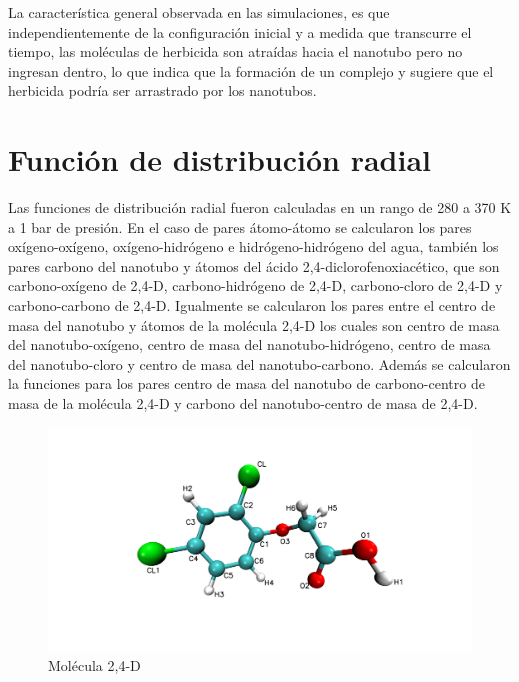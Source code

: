 La característica general observada en las simulaciones, es que independientemente de la configuración inicial y a medida que transcurre el tiempo, las moléculas de herbicida son atraídas hacia el nanotubo pero no ingresan dentro, lo que indica que la formación de un complejo y sugiere que el herbicida podría ser arrastrado por los nanotubos.

\section{Función de distribución radial}

Las funciones de distribución radial fueron calculadas en un rango de 280 a 370 K a 1 bar de presión. En el caso de pares átomo-átomo se calcularon los pares oxígeno-oxígeno, oxígeno-hidrógeno e hidrógeno-hidrógeno del agua, también los pares carbono del nanotubo y átomos del ácido 2,4-diclorofenoxiacético, que son carbono-oxígeno de 2,4-D, carbono-hidrógeno de 2,4-D, carbono-cloro de 2,4-D y carbono-carbono de 2,4-D. Igualmente se calcularon los pares entre el centro de masa del nanotubo y átomos de la molécula 2,4-D los cuales son centro de masa del nanotubo-oxígeno, centro de masa del nanotubo-hidrógeno, centro de masa del nanotubo-cloro y centro de masa del nanotubo-carbono. Además se calcularon la funciones para los pares centro de masa del nanotubo de carbono-centro de masa de la molécula 2,4-D y carbono del nanotubo-centro de masa de 2,4-D.\\

\begin{figure}[!h]
    \centering
    \includegraphics[width=.9\textwidth,keepaspectratio=true]{figura_nueva_tarea.png}
    \caption{Molécula 2,4-D}
    \label{fig:24Dfigureresultados}
\end{figure}

\newpage

